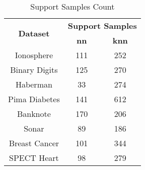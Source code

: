 \begin{table}[htbp]
\caption{Support Samples Count}
\begin{center}
\begin{tabular}{|c|c|c|}
\hline
\multirow{2}{*}{\textbf{Dataset}} & \multicolumn{2}{c|}{\textbf{Support Samples}} \\ \cline{2-3}
 & \textbf{nn} & \textbf{knn} \\ \hline
Ionosphere & 111 & 252 \\ \hline
Binary Digits & 125 & 270 \\ \hline
Haberman & 33 & 274 \\ \hline
Pima Diabetes & 141 & 612 \\ \hline
Banknote & 170 & 206 \\ \hline
Sonar & 89 & 186 \\ \hline
Breast Cancer & 101 & 344 \\ \hline
SPECT Heart & 98 & 279 \\ \hline
\end{tabular}
\label{tab:support}
\end{center}
\end{table}